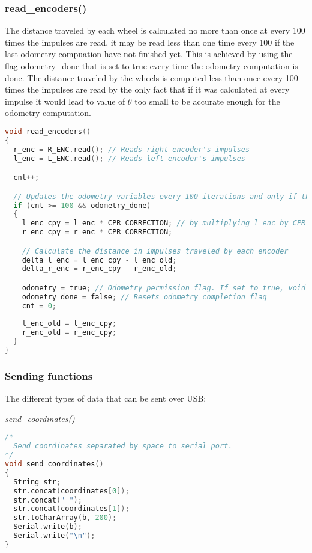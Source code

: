 \subsubsection{read\_encoders()}
The distance traveled by each wheel is calculated no more than once at every 100 times the impulses are read, it may be read less than one time every 100 if the last odometry compuation have not finished yet. 
This is achieved by using the flag odometry\_done that is set to true every time the odometry computation is done. The distance traveled by the wheels is computed less than once every 100 times the impulses are read 
by the only fact that if it was calculated at every impulse it would lead to value of $\theta$ too small to be accurate enough for the odometry computation.
\begin{lstlisting}[language=C]
void read_encoders()
{
  r_enc = R_ENC.read(); // Reads right encoder's impulses
  l_enc = L_ENC.read(); // Reads left encoder's impulses

  cnt++;

  // Updates the odometry variables every 100 iterations and only if the last odometry computation has finished
  if (cnt >= 100 && odometry_done)
  {
    l_enc_cpy = l_enc * CPR_CORRECTION; // by multiplying l_enc by CPR_CORRECTION it is taken in consideration the gear ratio error
    r_enc_cpy = r_enc * CPR_CORRECTION;

    // Calculate the distance in impulses traveled by each encoder
    delta_l_enc = l_enc_cpy - l_enc_old;
    delta_r_enc = r_enc_cpy - r_enc_old;

    odometry = true; // Odometry permission flag. If set to true, void loop() can compute the odometry
    odometry_done = false; // Resets odometry completion flag
    cnt = 0;
    
    l_enc_old = l_enc_cpy; 
    r_enc_old = r_enc_cpy;
  }
}
\end{lstlisting}

\subsubsection{Sending functions}
The different types of data that can be sent over USB:

\textit{send\_coordinates()}

\begin{lstlisting}[language=C]
/* 
  Send coordinates separated by space to serial port. 
*/
void send_coordinates()
{
  String str;
  str.concat(coordinates[0]);
  str.concat(" ");
  str.concat(coordinates[1]);
  str.toCharArray(b, 200);
  Serial.write(b);
  Serial.write("\n");
}
\end{lstlisting}


